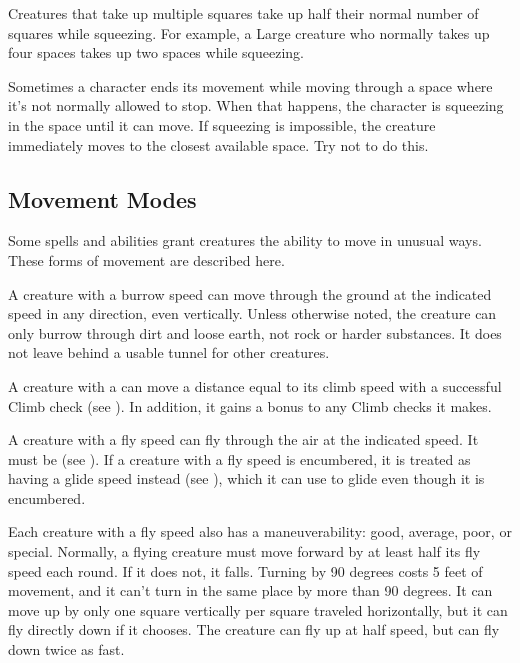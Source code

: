         Creatures that take up multiple squares take up half their normal number of squares while squeezing. For example, a Large creature who normally takes up four spaces takes up two spaces while squeezing.

         Sometimes a character ends its movement while moving through a space where it's not normally allowed to stop. When that happens, the character is squeezing in the space until it can move. If squeezing is impossible, the creature immediately moves to the closest available space. Try not to do this.

    \subsection{Movement Modes}\label{Movement Modes}
        Some spells and abilities grant creatures the ability to move in unusual ways. These forms of movement are described here.

        A creature with a burrow speed can move through the ground at the indicated speed in any direction, even vertically. Unless otherwise noted, the creature can only burrow through dirt and loose earth, not rock or harder substances. It does not leave behind a usable tunnel for other creatures.

        A creature with a  can move a distance equal to its climb speed with a successful Climb check (see ).
        In addition, it gains a  bonus to any Climb checks it makes.

        \label{Flying}
        A creature with a fly speed can fly through the air at the indicated speed. It must be  (see ). If a creature with a fly speed is encumbered, it is treated as having a glide speed instead (see ), which it can use to glide even though it is encumbered.

        Each creature with a fly speed also has a maneuverability: good, average, poor, or special. Normally, a flying creature must move forward by at least half its fly speed each round. If it does not, it falls. Turning by 90 degrees costs 5 feet of movement, and it can't turn in the same place by more than 90 degrees. It can move up by only one square vertically per square traveled horizontally, but it can fly directly down if it chooses. The creature can fly up at half speed, but can fly down twice as fast.

